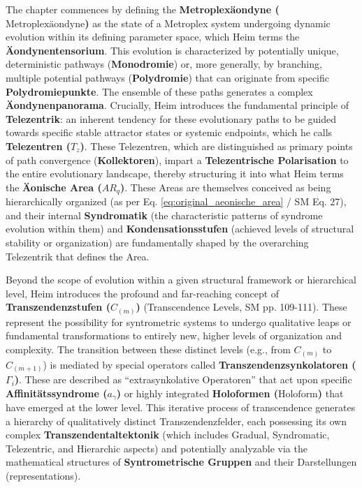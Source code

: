 \documentclass[12pt]{article}
\newcommand{\q}[1]{\enquote{#1}}
\newcommand{\holoform}{\text{Holoform}}
\newcommand{\metroplexaeondyne}{\text{Metroplexäondyne}}
\newcommand{\telezentrum}{T_z}
\newcommand{\aeonischearea}{AR_q}
\begin{document}
The chapter commences by defining the \textbf{Metroplexäondyne (\(\metroplexaeondyne\))} as the state of a Metroplex system undergoing dynamic evolution within its defining parameter space, which Heim terms the \textbf{Äondynentensorium}. This evolution is characterized by potentially unique, deterministic pathways (\textbf{Monodromie}) or, more generally, by branching, multiple potential pathways (\textbf{Polydromie}) that can originate from specific \textbf{Polydromiepunkte}. The ensemble of these paths generates a complex \textbf{Äondynenpanorama}. Crucially, Heim introduces the fundamental principle of \textbf{Telezentrik}: an inherent tendency for these evolutionary paths to be guided towards specific stable attractor states or systemic endpoints, which he calls \textbf{Telezentren (\( \telezentrum \))}. These Telezentren, which are distinguished as primary points of path convergence (\textbf{Kollektoren}), impart a \textbf{Telezentrische Polarisation} to the entire evolutionary landscape, thereby structuring it into what Heim terms the \textbf{Äonische Area (\( \aeonischearea \))}. These Areas are themselves conceived as being hierarchically organized (as per Eq. \eqref{eq:original_aeonische_area} / SM Eq. 27), and their internal \textbf{Syndromatik} (the characteristic patterns of syndrome evolution within them) and \textbf{Kondensationsstufen} (achieved levels of structural stability or organization) are fundamentally shaped by the overarching Telezentrik that defines the Area.

Beyond the scope of evolution within a given structural framework or hierarchical level, Heim introduces the profound and far-reaching concept of \textbf{Transzendenzstufen (\( C_{(m)} \))} (Transcendence Levels, SM pp. 109-111). These represent the possibility for syntrometric systems to undergo qualitative leaps or fundamental transformations to entirely new, higher levels of organization and complexity. The transition between these distinct levels (e.g., from \( C_{(m)} \) to \( C_{(m+1)} \)) is mediated by special operators called \textbf{Transzendenzsynkolatoren (\( \Gamma_i \))}. These are described as \q{extrasynkolative Operatoren} that act upon specific \textbf{Affinitätssyndrome (\( a_\gamma \))} or highly integrated \textbf{Holoformen (\(\holoform\))} that have emerged at the lower level. This iterative process of transcendence generates a hierarchy of qualitatively distinct Transzendenzfelder, each possessing its own complex \textbf{Transzendentaltektonik} (which includes Gradual, Syndromatic, Telezentric, and Hierarchic aspects) and potentially analyzable via the mathematical structures of \textbf{Syntrometrische Gruppen} and their Darstellungen (representations).
\end{document}
